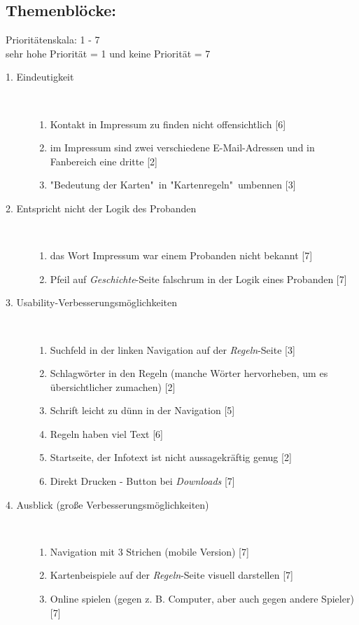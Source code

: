 \documentclass{scrartcl}
\begin{document}
\begin{enumerate}
\subsection*{Themenblöcke:}
Prioritätenskala: 1 - 7 \\
sehr hohe Priorität = 1 und keine Priorität = 7
\begin{description}
\item[1. Eindeutigkeit] \
\begin{enumerate} 
\item Kontakt in Impressum zu finden nicht offensichtlich [6]
\item im Impressum sind zwei verschiedene E-Mail-Adressen und in Fanbereich eine dritte [2]
\item "Bedeutung der Karten"\ in "Kartenregeln"\ umbennen [3]
\end{enumerate}
\item[2. Entspricht nicht der Logik des Probanden] \
\begin{enumerate} 
\item das Wort Impressum war einem Probanden nicht bekannt [7]
\item Pfeil auf \textit{Geschichte}-Seite falschrum in der Logik eines Probanden [7]
\end{enumerate}
\item[3. Usability-Verbesserungsmöglichkeiten] \
\begin{enumerate}
\item Suchfeld in der linken Navigation auf der \textit{Regeln}-Seite [3]
\item Schlagwörter in den Regeln (manche Wörter hervorheben, um es übersichtlicher zumachen) [2]
\item Schrift leicht zu dünn in der Navigation [5]
\item Regeln haben viel Text [6]
\item Startseite, der Infotext ist nicht aussagekräftig genug [2]
\item Direkt Drucken - Button bei \textit{Downloads} [7]
\end{enumerate}
\item[4. Ausblick (große Verbesserungsmöglichkeiten)] \
\begin{enumerate}
\item Navigation mit 3 Strichen (mobile Version) [7]
\item Kartenbeispiele auf der \textit{Regeln}-Seite visuell darstellen [7]
\item Online spielen (gegen z. B. Computer, aber auch gegen andere Spieler) [7]
\end{enumerate}
\end{description}

\end{enumerate}
\end{document}
